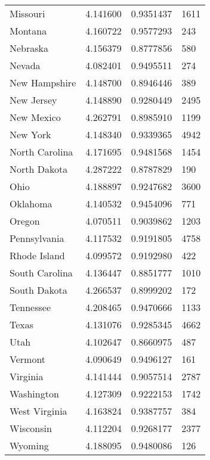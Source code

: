 \documentclass[
]{article}
\begin{document}
\begin{landscape}
\begin{longtable}[t]{llll}
Missouri & 4.141600 & 0.9351437 & 1611\\
\addlinespace
Montana & 4.160722 & 0.9577293 & 243\\
Nebraska & 4.156379 & 0.8777856 & 580\\
Nevada & 4.082401 & 0.9495511 & 274\\
New Hampshire & 4.148700 & 0.8946446 & 389\\
New Jersey & 4.148890 & 0.9280449 & 2495\\
\addlinespace
New Mexico & 4.262791 & 0.8985910 & 1199\\
New York & 4.148340 & 0.9339365 & 4942\\
North Carolina & 4.171695 & 0.9481568 & 1454\\
North Dakota & 4.287222 & 0.8787829 & 190\\
Ohio & 4.188897 & 0.9247682 & 3600\\
\addlinespace
Oklahoma & 4.140532 & 0.9454096 & 771\\
Oregon & 4.070511 & 0.9039862 & 1203\\
Pennsylvania & 4.117532 & 0.9191805 & 4758\\
Rhode Island & 4.099572 & 0.9192980 & 422\\
South Carolina & 4.136447 & 0.8851777 & 1010\\
\addlinespace
South Dakota & 4.266537 & 0.8999202 & 172\\
Tennessee & 4.208465 & 0.9470666 & 1133\\
Texas & 4.131076 & 0.9285345 & 4662\\
Utah & 4.102647 & 0.8660975 & 487\\
Vermont & 4.090649 & 0.9496127 & 161\\
\addlinespace
Virginia & 4.141444 & 0.9057514 & 2787\\
Washington & 4.127309 & 0.9222153 & 1742\\
West Virginia & 4.163824 & 0.9387757 & 384\\
Wisconsin & 4.112204 & 0.9268177 & 2377\\
Wyoming & 4.188095 & 0.9480086 & 126\\*
\end{longtable}
\end{landscape}
\endgroup{}

\begingroup\fontsize{12}{14}\selectfont
\end{document}
